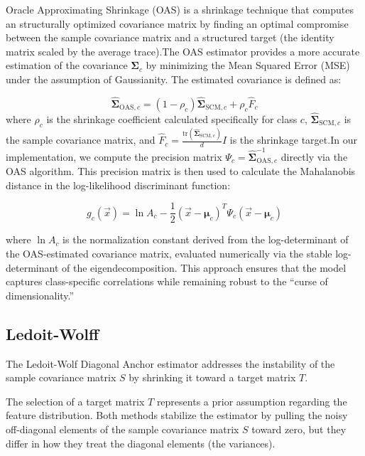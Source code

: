 Oracle Approximating Shrinkage (OAS) is a shrinkage technique that computes an structurally optimized covariance matrix by finding an optimal compromise between the sample covariance matrix and a structured target (the identity matrix scaled by the average trace).The OAS estimator provides a more accurate estimation of the covariance $\boldsymbol{\Sigma}_c$ by minimizing the Mean Squared Error (MSE) under the assumption of Gaussianity. The estimated covariance is defined as:

\begin{equation}
	\hat{\boldsymbol{\Sigma}}_{\text{OAS}, c} = (1 - \rho_c) \hat{\boldsymbol{\Sigma}}_{\text{SCM}, c} + \rho_c \hat{F}_c
\end{equation}
where $\rho_c$ is the shrinkage coefficient calculated specifically for class $c$, $\hat{\boldsymbol{\Sigma}}_{\text{SCM}, c}$ is the sample covariance matrix, and $\hat{F}_c = \frac{\text{tr}(\hat{\boldsymbol{\Sigma}}_{\text{SCM}, c})}{d} I$ is the shrinkage target.In our implementation, we compute the precision matrix $\Psi_c = \hat{\boldsymbol{\Sigma}}_{\text{OAS}, c}^{-1}$ directly via the OAS algorithm. This precision matrix is then used to calculate the Mahalanobis distance in the log-likelihood discriminant function:

\begin{equation}
	g_c(\vec{x}) = \ln A_c - \frac{1}{2} (\vec{x} - \boldsymbol{\mu}_c)^T \Psi_c (\vec{x} - \boldsymbol{\mu}_c)
\end{equation}

where $\ln A_c$ is the normalization constant derived from the log-determinant of the OAS-estimated covariance matrix, evaluated numerically via the stable log-determinant of the eigendecomposition. This approach ensures that the model captures class-specific correlations while remaining robust to the ``curse of dimensionality.''

\subsection{Ledoit-Wolff}
\label{sec:method:ledoitwolf}

The Ledoit-Wolf Diagonal Anchor estimator addresses the instability of the sample covariance matrix $S$ by shrinking it toward a target matrix $T$.

The selection of a target matrix $T$ represents a prior assumption regarding the feature distribution. Both methods stabilize the estimator by pulling the noisy off-diagonal elements of the sample covariance matrix $S$ toward zero, but they differ in how they treat the diagonal elements (the variances).

